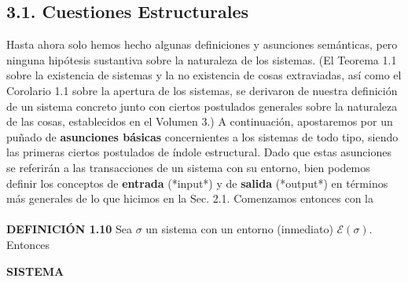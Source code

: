 {\subsection*{3.1. Cuestiones Estructurales}
Hasta ahora solo hemos hecho algunas definiciones y asunciones semánticas, pero ninguna hipótesis sustantiva sobre la naturaleza de los sistemas. (El Teorema 1.1 sobre la existencia de sistemas y la no existencia de cosas extraviadas, así como el Corolario 1.1 sobre la apertura de los sistemas, se derivaron de nuestra definición de un sistema concreto junto con ciertos postulados generales sobre la naturaleza de las cosas, establecidos en el Volumen 3.) A continuación, apostaremos por un puñado de \textbf{asunciones básicas} concernientes a los sistemas de todo tipo, siendo las primeras ciertos postulados de índole estructural. Dado que estas asunciones se referirán a las transacciones de un sistema con su entorno, bien podemos definir los conceptos de \textbf{entrada} (*input*) y de \textbf{salida} (*output*) en términos más generales de lo que hicimos en la Sec. 2.1. Comenzamos entonces con la
\\\\
\textbf{DEFINICIÓN 1.10} Sea $\sigma$ un sistema con un entorno (inmediato) $\mathcal{E}(\sigma)$. Entonces
}

\newpage
\fancyhf{}
\fancyhead[r]{\thepage}
\begin{center}
{\fontsize{13}{16}\selectfont \textbf{SISTEMA}}
\end{center}
\vspace{0.5cm}

